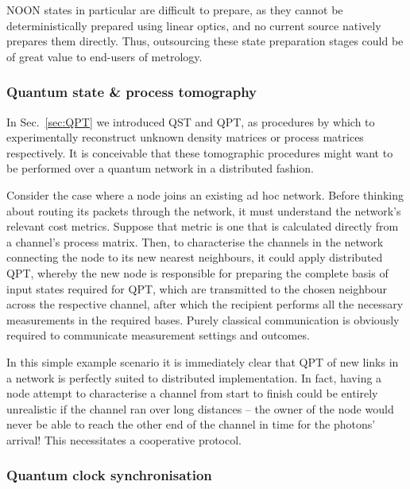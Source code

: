 \documentclass[aps, rmp, twocolumn, amsmath, amssymb, nofootinbib, superscriptaddress, longbibliography, floatfix, table-of-contents, eqsecnum]{revtex4-1}
\begin{document}
NOON states in particular are difficult to prepare, as they cannot be deterministically prepared using linear optics, and no current source natively prepares them directly. Thus, outsourcing these state preparation stages could be of great value to end-users of metrology.

\cite{DomBerry}

%
%

\subsubsection{Quantum state \& process tomography}  

In Sec.~\ref{sec:QPT} we introduced QST and QPT, as procedures by which to experimentally reconstruct unknown density matrices or process matrices respectively. It is conceivable that these tomographic procedures might want to be performed over a quantum network in a distributed fashion.

Consider the case where a node joins an existing ad hoc network. Before thinking about routing its packets through the network, it must understand the network's relevant cost metrics. Suppose that metric is one that is calculated directly from a channel's process matrix. Then, to characterise the channels in the network connecting the node to its new nearest neighbours, it could apply distributed QPT, whereby the new node is responsible for preparing the complete basis of input states required for QPT, which are transmitted to the chosen neighbour across the respective channel, after which the recipient performs all the necessary measurements in the required bases. Purely classical communication is obviously required to communicate measurement settings and outcomes.

In this simple example scenario it is immediately clear that QPT of new links in a network is perfectly suited to distributed implementation. In fact, having a node attempt to characterise a channel from start to finish could be entirely unrealistic if the channel ran over long distances -- the owner of the node would never be able to reach the other end of the channel in time for the photons' arrival! This necessitates a cooperative protocol.

%
%

\subsubsection{Quantum clock synchronisation} 
\end{document}
